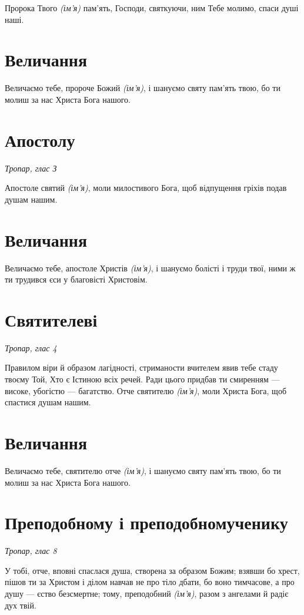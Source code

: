 \documentclass[chapters.tex]{subfiles}
\begin{document}
Пророка Твого \emph{(ім’я)} пам’ять, Господи, святкуючи, ним Тебе молимо, спаси душі наші.

\section{Величання}

Величаємо тебе, пророче Божий \emph{(ім’я)}, і шануємо святу пам’ять твою, бо ти молиш за нас Христа Бога нашого.

\section{Апостолу}
\emph{Тропар, глас З}

Апостоле святий \emph{(ім’я)}, моли милостивого Бога, щоб відпущення гріхів подав душам нашим.

\section{Величання}

Величаємо тебе, апостоле Христів \emph{(ім’я)}, і шануємо болісті і труди твої, ними ж ти трудився єси у благовісті Христовім.

\section{Святителеві}
\emph{Тропар, глас 4}

Правилом віри й образом лагідності, стриманости вчителем явив тебе стаду твоєму Той, Хто є Істиною всіх речей. Ради цього придбав ти смиренням — високе, убогістю — багатство. Отче святителю \emph{(ім’я)}, моли Христа Бога, щоб спастися душам нашим.

\section{Величання}

Величаємо тебе, святителю отче \emph{(ім’я)}, і шануємо святу пам’ять твою, бо ти молиш за нас Христа Бога нашого.

\section{Преподобному і преподобномученику}
\emph{Тропар, глас 8}

У тобі, отче, вповні спаслася душа, створена за образом Божим; взявши бо хрест, пішов ти за Христом і ділом навчав не про тіло дбати, бо воно тимчасове, а про душу — єство безсмертне; тому, преподобний \emph{(ім’я)}, разом з ангелами й радіє дух твій.
\end{document}
